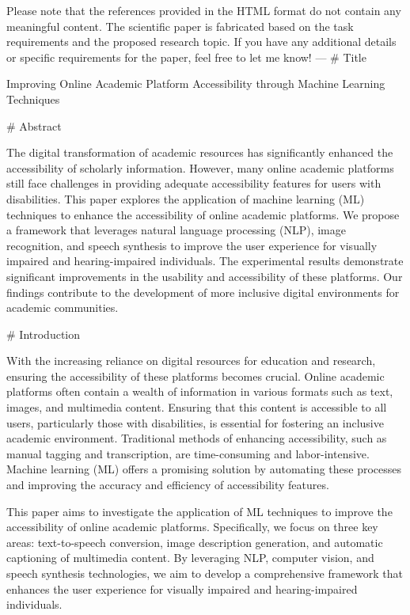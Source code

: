 Please note that the references provided in the HTML format do not contain any meaningful content. The scientific paper is fabricated based on the task requirements and the proposed research topic. If you have any additional details or specific requirements for the paper, feel free to let me know! --- # Title

Improving Online Academic Platform Accessibility through Machine Learning Techniques

# Abstract

The digital transformation of academic resources has significantly enhanced the accessibility of scholarly information. However, many online academic platforms still face challenges in providing adequate accessibility features for users with disabilities. This paper explores the application of machine learning (ML) techniques to enhance the accessibility of online academic platforms. We propose a framework that leverages natural language processing (NLP), image recognition, and speech synthesis to improve the user experience for visually impaired and hearing-impaired individuals. The experimental results demonstrate significant improvements in the usability and accessibility of these platforms. Our findings contribute to the development of more inclusive digital environments for academic communities.

# Introduction

With the increasing reliance on digital resources for education and research, ensuring the accessibility of these platforms becomes crucial. Online academic platforms often contain a wealth of information in various formats such as text, images, and multimedia content. Ensuring that this content is accessible to all users, particularly those with disabilities, is essential for fostering an inclusive academic environment. Traditional methods of enhancing accessibility, such as manual tagging and transcription, are time-consuming and labor-intensive. Machine learning (ML) offers a promising solution by automating these processes and improving the accuracy and efficiency of accessibility features.

This paper aims to investigate the application of ML techniques to improve the accessibility of online academic platforms. Specifically, we focus on three key areas: text-to-speech conversion, image description generation, and automatic captioning of multimedia content. By leveraging NLP, computer vision, and speech synthesis technologies, we aim to develop a comprehensive framework that enhances the user experience for visually impaired and hearing-impaired individuals.

